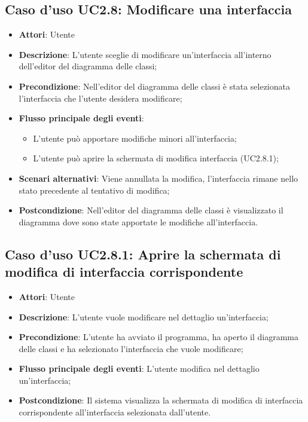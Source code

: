 \documentclass[../AnalisiDeiRequisiti.tex]{subfiles}
\begin{document}
		\subsection{Caso d'uso UC2.8: Modificare una interfaccia}
		\begin{itemize}
			\item \textbf{Attori}: Utente
			\item \textbf{Descrizione}: L'utente sceglie di modificare un'interfaccia all'interno dell'editor del diagramma delle classi;
			\item \textbf{Precondizione}: Nell'editor del diagramma delle classi è stata selezionata l'interfaccia che l'utente desidera modificare;
			\item \textbf{Flusso principale degli eventi}: \begin{itemize}
				\item L'utente può apportare modifiche minori all'interfaccia;
				\item L'utente può aprire la schermata di modifica interfaccia (UC2.8.1);
			\end{itemize}
			\item \textbf{Scenari alternativi}: Viene annullata la modifica, l'interfaccia rimane nello stato precedente al tentativo di modifica;
			\item \textbf{Postcondizione}: Nell'editor del diagramma delle classi è visualizzato il diagramma dove sono state apportate le modifiche all'interfaccia.
		\end{itemize}
		\subsection{Caso d'uso UC2.8.1: Aprire la schermata di modifica di interfaccia corrispondente}
		\begin{itemize}
			\item \textbf{Attori}: Utente
			\item \textbf{Descrizione}: L'utente vuole modificare nel dettaglio un'interfaccia;
			\item \textbf{Precondizione}: L'utente ha avviato il programma, ha aperto il diagramma delle classi e ha selezionato l'interfaccia che vuole modificare;
			\item \textbf{Flusso principale degli eventi}: L'utente modifica nel dettaglio un'interfaccia;
			\item \textbf{Postcondizione}: Il sistema visualizza la schermata di modifica di interfaccia corrispondente all'interfaccia selezionata dall'utente.
		\end{itemize}
\end{document}
